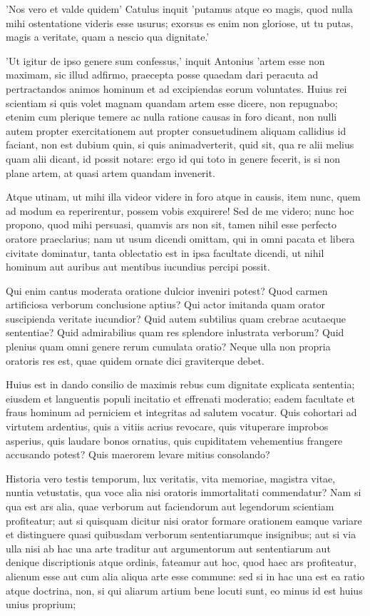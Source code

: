  'Nos vero et valde quidem' Catulus inquit 'putamus atque eo magis, quod nulla mihi ostentatione videris esse usurus; exorsus es enim non gloriose, ut tu putas, magis a veritate, quam a nescio qua dignitate.'

 'Ut igitur de ipso genere sum confessus,' inquit Antonius 'artem esse non maximam, sic illud adfirmo, praecepta posse quaedam dari peracuta ad pertractandos animos hominum et ad excipiendas eorum voluntates. Huius rei scientiam si quis volet magnam quandam artem esse dicere, non repugnabo; etenim cum plerique temere ac nulla ratione causas in foro dicant, non nulli autem propter exercitationem aut propter consuetudinem aliquam callidius id faciant, non est dubium quin, si quis animadverterit, quid sit, qua re alii melius quam alii dicant, id possit notare: ergo id qui toto in genere fecerit, is si non plane artem, at quasi artem quandam invenerit.

 Atque utinam, ut mihi illa videor videre in foro atque in causis, item nunc, quem ad modum ea reperirentur, possem vobis exquirere! Sed de me videro; nunc hoc propono, quod mihi persuasi, quamvis ars non sit, tamen nihil esse perfecto oratore praeclarius; nam ut usum dicendi omittam, qui in omni pacata et libera civitate dominatur, tanta oblectatio est in ipsa facultate dicendi, ut nihil hominum aut auribus aut mentibus iucundius percipi possit.

 Qui enim cantus moderata oratione dulcior inveniri potest? Quod carmen artificiosa verborum conclusione aptius? Qui actor imitanda quam orator suscipienda veritate iucundior? Quid autem subtilius quam crebrae acutaeque sententiae? Quid admirabilius quam res splendore inlustrata verborum? Quid plenius quam omni genere rerum cumulata oratio? Neque ulla non propria oratoris res est, quae quidem ornate dici graviterque debet.

 Huius est in dando consilio de maximis rebus cum dignitate explicata sententia; eiusdem et languentis populi incitatio et effrenati moderatio; eadem facultate et fraus hominum ad perniciem et integritas ad salutem vocatur. Quis cohortari ad virtutem ardentius, quis a vitiis acrius revocare, quis vituperare improbos asperius, quis laudare bonos ornatius, quis cupiditatem vehementius frangere accusando potest? Quis maerorem levare mitius consolando?

 Historia vero testis temporum, lux veritatis, vita memoriae, magistra vitae, nuntia vetustatis, qua voce alia nisi oratoris immortalitati commendatur? Nam si qua est ars alia, quae verborum aut faciendorum aut legendorum scientiam profiteatur; aut si quisquam dicitur nisi orator formare orationem eamque variare et distinguere quasi quibusdam verborum sententiarumque insignibus; aut si via ulla nisi ab hac una arte traditur aut argumentorum aut sententiarum aut denique discriptionis atque ordinis, fateamur aut hoc, quod haec ars profiteatur, alienum esse aut cum alia aliqua arte esse commune: sed si in hac una est ea ratio atque doctrina, non, si qui aliarum artium bene locuti sunt, eo minus id est huius unius proprium;

